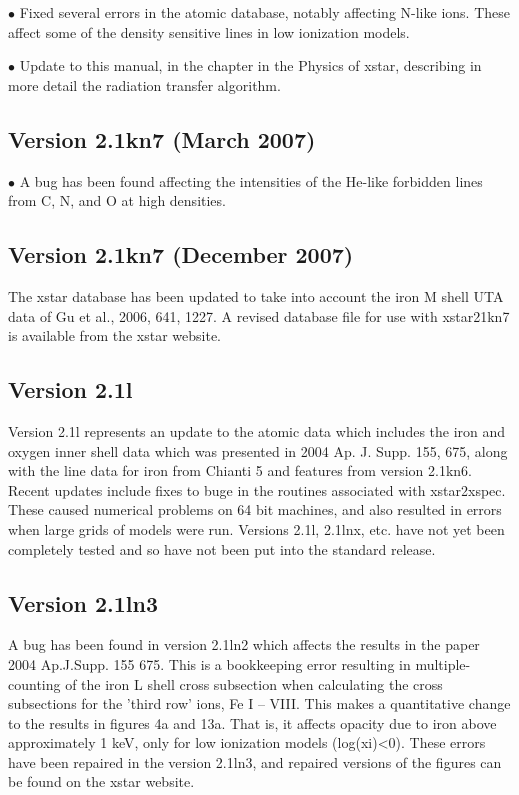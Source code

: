 $\bullet$ Fixed several errors in the atomic database, notably affecting
N-like ions.  These affect some of the density sensitive lines in low ionization
models.

$\bullet$ Update to this manual, in the chapter in the Physics of xstar, 
describing in more detail the radiation transfer algorithm.


\subsection{Version 2.1kn7 (March 2007)}

$\bullet$ A bug has been found affecting the intensities of the He-like forbidden
lines from C, N, and O at high densities. 

\subsection{Version 2.1kn7 (December 2007)}

The xstar database has been updated to take into account the iron M shell 
UTA data of Gu et al., 2006, 641, 1227. A revised database file for use 
with xstar21kn7 is available from the xstar website.

\subsection{Version 2.1l}

Version 2.1l represents an update to the atomic data which includes 
the iron and oxygen inner shell data which was presented in 
 2004 Ap. J. Supp. 155, 675, along with the line data for iron 
from Chianti 5 and features from version 2.1kn6. Recent updates 
include fixes to buge in the routines associated with xstar2xspec. 
These caused numerical problems on 64 bit machines, and also resulted 
in errors when large grids of models were run.  Versions 2.1l, 2.1lnx, etc.
have not yet been completely tested and so 
have not been put into the standard release.

\subsection{Version 2.1ln3}

A bug has been found in version 2.1ln2 which affects the results in the 
paper 2004 Ap.J.Supp. 155 675. This is a bookkeeping error resulting in 
multiple-counting of the iron L shell cross subsection when calculating 
the cross subsections for the 'third row' ions, Fe I -- VIII. This makes a 
quantitative change to the results in figures 4a and 13a. That is, it 
affects opacity due to iron above approximately 1 keV, only for low 
ionization models (log(xi)<0). These errors have been repaired in the 
version 2.1ln3, and repaired versions of the figures can be 
found on the xstar website.

